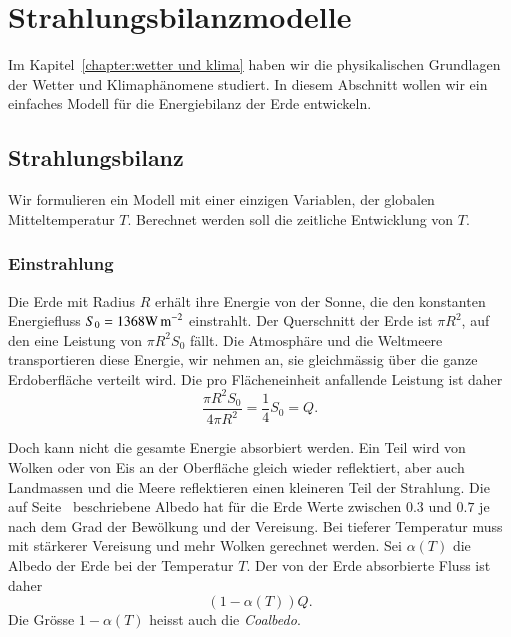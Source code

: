 %
%
%
\section{Strahlungsbilanzmodelle\label{skript:section:budyko}}
Im Kapitel~\ref{chapter:wetter und klima} haben wir die physikalischen
Grundlagen der Wetter und Klimaphänomene studiert.
In diesem Abschnitt wollen wir ein einfaches Modell für die Energiebilanz
der Erde entwickeln.

\subsection{Strahlungsbilanz\label{skript:subsection:strahlungsbilanz}}
Wir formulieren ein Modell mit einer einzigen Variablen, der globalen
Mitteltemperatur $T$.
Berechnet werden soll die zeitliche Entwicklung von $T$.

\subsubsection{Einstrahlung}
Die Erde mit Radius $R$ erhält ihre Energie von der Sonne, die
den konstanten Energiefluss $S_0 = 1368 \text{W\,m}^{-2}$
einstrahlt.
Der Querschnitt der Erde ist $\pi R^2$, auf den eine Leistung von
$\pi R^2 S_0$ fällt.
Die Atmosphäre und die Weltmeere transportieren diese Energie, wir nehmen
an, sie gleichmässig über die ganze Erdoberfläche verteilt wird.
Die pro Flächeneinheit anfallende Leistung ist daher
\begin{equation}
\frac{\pi R^2 S_0}{4\pi R^2} = \frac14S_0=Q.
\label{skript:bilanz:einstrahlung}
\end{equation}

Doch kann nicht die gesamte Energie absorbiert werden.
Ein Teil wird von Wolken oder von Eis an der Oberfläche 
gleich wieder reflektiert, aber auch Landmassen und die Meere reflektieren
einen kleineren Teil der Strahlung.
Die auf Seite~\pageref{skript:subsubsection:albedo} beschriebene Albedo
hat für die Erde Werte zwischen $0.3$ und $0.7$ je nach dem Grad der
Bewölkung und der Vereisung.
Bei tieferer Temperatur muss mit stärkerer Vereisung und mehr Wolken
gerechnet werden.
Sei $\alpha(T)$ die Albedo der Erde bei der Temperatur $T$.
Der von der Erde absorbierte Fluss ist daher
\begin{equation}
(1-\alpha(T)) Q.
\label{skript:bilanz:ausstrahlung}
\end{equation}
Die Grösse $1-\alpha(T)$ heisst auch die {\em Coalbedo}.
%

